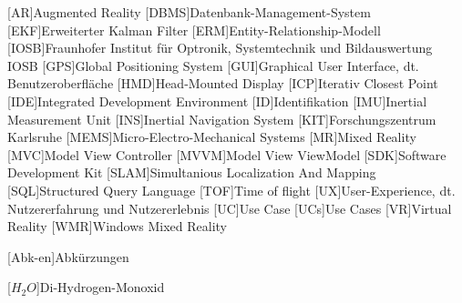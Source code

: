 \begin{acronym}[DHBW]
 [AR]{Augmented Reality}
 [DBMS]{Datenbank-Management-System}
 [EKF]{Erweiterter Kalman Filter}
 [ERM]{Entity-Relationship-Modell}
 [IOSB]{Fraunhofer Institut für Optronik, Systemtechnik und Bildauswertung IOSB}
 [GPS]{Global Positioning System}
 [GUI]{Graphical User Interface, dt. Benutzeroberfläche}
 [HMD]{Head-Mounted Display}
 [ICP]{Iterativ Closest Point}
 [IDE]{Integrated Development Environment}
 [ID]{Identifikation}
 [IMU]{Inertial Measurement Unit}
 [INS]{Inertial Navigation System}
 [KIT]{Forschungszentrum Karlsruhe}
 [MEMS]{Micro-Electro-Mechanical Systems}
 [MR]{Mixed Reality}
 [MVC]{Model View Controller}
 [MVVM]{Model View ViewModel}
 [SDK]{Software Development Kit}
 [SLAM]{Simultanious Localization And Mapping}
 [SQL]{Structured Query Language}
 [TOF]{Time of flight}
 [UX]{User-Experience, dt. Nutzererfahrung und Nutzererlebnis}
 [UC]{Use Case}
 [UCs]{Use Cases}
 [VR]{Virtual Reality}
 [WMR]{Windows Mixed Reality}

 [Abk-en]{Abkürzungen}


 [\ensuremath{H_2O}]{Di-Hydrogen-Monoxid}

\end{acronym}
